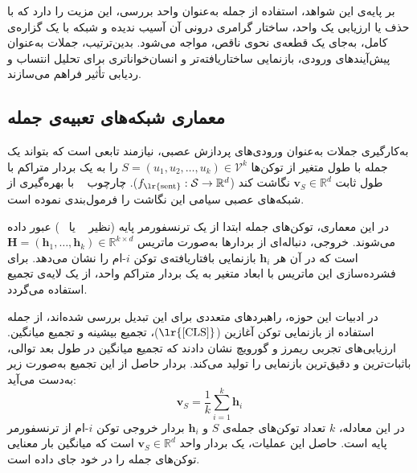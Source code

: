 بر پایه‌ی این شواهد، استفاده از جمله به‌عنوان واحد بررسی، این مزیت را دارد که با حذف یا ارزیابی یک واحد، ساختار گرامری درونی آن آسیب ندیده و شبکه با یک گزاره‌ی کامل، به‌جای یک قطعه‌ی نحوی ناقص، مواجه می‌شود. بدین‌ترتیب، جملات به‌عنوان پیش‌آیندهای ورودی، بازنمایی ساختاریافته‌تر و انسان‌خواناتری برای تحلیل انتساب و ردیابی تأثیر فراهم می‌سازند.


\subsection{معماری شبکه‌های تعبیه‌ی جمله}\label{sec:2-3-4}

به‌کارگیری جملات به‌عنوان ورودی‌های پردازش عصبی، نیازمند تابعی است که بتواند یک جمله با طول متغیر از توکن‌ها $S = (u_1, u_2, \dots, u_k) \in \mathcal{V}^k$ را به یک بردار متراکم با طول ثابت $\mathbf{v}_S \in \mathbb{R}^d$ نگاشت کند ($f_{\text{\lr{sent}}}: \mathcal{S} \to \mathbb{R}^d$). چارچوب ~\cite{reimers2019sentencebert} با بهره‌گیری از شبکه‌های عصبی سیامی این نگاشت را فرمول‌بندی نموده است.

در این معماری، توکن‌های جمله ابتدا از یک ترنسفورمر پایه (نظیر ~\cite{devlin2019bert} یا ~\cite{liu2021roberta}) عبور داده می‌شوند. خروجی، دنباله‌ای از بردارها به‌صورت ماتریس $\mathbf{H} = (\mathbf{h}_1, \dots, \mathbf{h}_k) \in \mathbb{R}^{k \times d}$ است که در آن هر $\mathbf{h}_i$ بازنمایی بافتاریافته‌ی توکن $i$-ام را نشان می‌دهد. برای فشرده‌سازی این ماتریس با ابعاد متغیر به یک بردار متراکم واحد، از یک لایه‌ی تجمیع استفاده می‌گردد.

در ادبیات این حوزه، راهبردهای متعددی برای این تبدیل بررسی شده‌اند، از جمله استفاده از بازنمایی توکن آغازین ($\text{\lr{[CLS]}}$)، تجمیع بیشینه و تجمیع میانگین. ارزیابی‌های تجربی ریمرز و گورویچ نشان دادند که تجمیع میانگین در طول بعد توالی، باثبات‌ترین و دقیق‌ترین بازنمایی را تولید می‌کند. بردار حاصل از این تجمیع به‌صورت زیر به‌دست می‌آید:
\begin{equation}\label{eq:chap2_mean_pooling}
    \mathbf{v}_S = \frac{1}{k} \sum_{i=1}^k \mathbf{h}_i
\end{equation}
در این معادله، $k$ تعداد توکن‌های جمله‌ی $S$ و $\mathbf{h}_i$ بردار خروجی توکن $i$-ام از ترنسفورمر پایه است. حاصل این عملیات، یک بردار واحد $\mathbf{v}_S \in \mathbb{R}^d$ است که میانگین بار معنایی توکن‌های جمله را در خود جای داده است.

